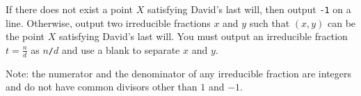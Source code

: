 If there does not exist a point $X$ satisfying David's last will, then output \verb+-1+
on a line. Otherwise, output two irreducible fractions $x$ and $y$ such that 
$(x,y)$ can be the point $X$ satisfying David's last will. 
You must output an irreducible fraction $t=\frac{n}{d}$ as $n$\verb+/+$d$ and
use a blank to separate $x$ and $y$.

Note: the numerator and the denominator of any irreducible fraction are integers
and do not have common divisors other than $1$ and $-1$.
